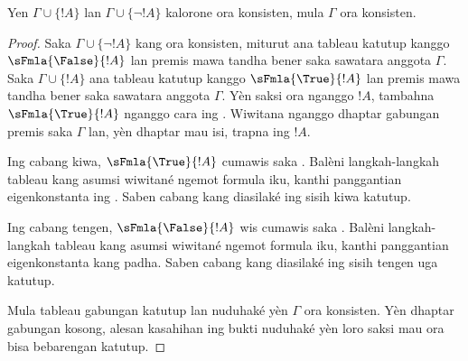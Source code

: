 \documentclass[../../../include/open-logic-section]{subfiles}
\begin{document}
\begin{prop}
  Yen $\Gamma \cup \{!A\}$ lan $\Gamma \cup \{\lnot !A\}$ kalorone
  ora konsisten, mula $\Gamma$ ora konsisten.
\end{prop}

\begin{proof}
  Saka $\Gamma \cup \{\lnot !A\}$ kang ora konsisten, miturut
   ana tableau katutup kanggo
  $\sFmla{\False}{!A}$ lan premis mawa tandha bener saka sawatara
  anggota $\Gamma$. Saka $\Gamma \cup \{!A\}$ ana tableau katutup
  kanggo $\sFmla{\True}{!A}$ lan premis mawa tandha bener saka sawatara
  anggota $\Gamma$. Yèn saksi ora nganggo $!A$, tambahna
  $\sFmla{\True}{!A}$ nganggo cara ing .
  Wiwitana nganggo dhaptar gabungan premis saka $\Gamma$ lan, yèn
  dhaptar mau isi, trapna \Cut{} ing $!A$.

  Ing cabang kiwa, $\sFmla{\True}{!A}$ cumawis saka \Cut{}.
  Balèni langkah-langkah tableau kang asumsi wiwitané ngemot formula iku,
  kanthi panggantian eigenkonstanta ing .
  Saben cabang kang diasilaké ing sisih kiwa katutup.

  Ing cabang tengen, $\sFmla{\False}{!A}$ wis cumawis saka \Cut{}.
  Balèni langkah-langkah tableau kang asumsi wiwitané ngemot formula iku,
  kanthi panggantian eigenkonstanta kang padha. Saben cabang kang
  diasilaké ing sisih tengen uga katutup.

  Mula tableau gabungan katutup lan nuduhaké yèn $\Gamma$ ora
  konsisten. Yèn dhaptar gabungan kosong, alesan kasahihan ing bukti
   nuduhaké yèn loro saksi mau ora bisa
  bebarengan katutup.
  \end{proof}
\end{document}
